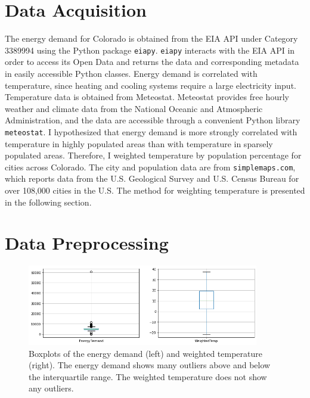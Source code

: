 \documentclass[12pt]{article}
\begin{document}
\section*{Data Acquisition} 

The energy demand for Colorado is obtained from the EIA API under Category 3389994 using the Python package \texttt{eiapy}. \texttt{eiapy} interacts with the EIA API in order to access its Open Data and returns the data and corresponding metadata in easily accessible Python classes. Energy demand is correlated with temperature, since heating and cooling systems require a large electricity input. Temperature data is obtained from Meteostat. Meteostat provides free hourly weather and climate data from the National Oceanic and Atmospheric Administration, and the data are accessible through a convenient Python library \texttt{meteostat}. I hypothesized that energy demand is more strongly correlated with temperature in highly populated areas than with temperature in sparsely populated areas. Therefore, I weighted temperature by population percentage for cities across Colorado. The city and population data are from \texttt{simplemaps.com}, which reports data from the U.S. Geological Survey and U.S. Census Bureau for over 108,000 cities in the U.S. The method for weighting temperature is presented in the following section. 

\section*{Data Preprocessing} 

\begin{figure}[h]
    \centering
    \includegraphics[width=0.9\textwidth]{figures/boxplots.png}
    \caption{Boxplots of the energy demand (left) and weighted temperature (right). The energy demand shows many outliers above and below the interquartile range. The weighted temperature does not show any outliers.}
    \label{fig:boxplots}
\end{figure}
\end{document}
